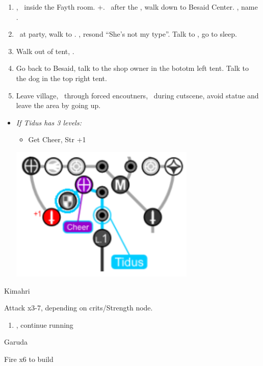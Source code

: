 \begin{enumerate}[resume]
	\item \cs[1:00], \sd\ inside the Fayth room. \fmv+\cs[1:00]. \sd\ after the \fmv, walk down to Besaid Center. \cs[1:40], name \valefor.
	\item \sd\ at party, walk to \yuna. \sd, resond ``She's not my type''. Talk to \wakka, go to sleep.
	\item Walk out of tent, \sd.
	\item Go back to Besaid, talk to the shop owner in the bototm left tent. Talk to the dog in the top right tent.
	\item Leave village, \sd\ through forced encoutners, \sd\ during cutscene, avoid statue and leave the area by going up.
\end{enumerate}
\begin{spheregrid}
	\begin{itemize}
	\item \textit{If Tidus has 3 levels:}
	\begin{itemize}
		\item Get Cheer, Str +1
	\end{itemize}
	\includegraphics{graphics/tiduscheer}
	\end{itemize}
\end{spheregrid}
\begin{battle}[750]{Kimahri}
\begin{itemize}
	\tidusf Attack x3-7, depending on crits/Strength node.
\end{itemize}
\end{battle}
\begin{enumerate}[resume]
	\item \sd, continue running
\end{enumerate}
\begin{battle}{Garuda}
	\begin{itemize}
		\summon{\valefor}
		\valeforf Fire x6 to build \od
	\end{itemize}
\end{battle}

